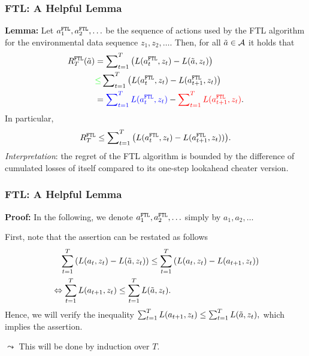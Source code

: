 \documentclass[11pt,compress,t,notes=noshow, xcolor=table]{beamer}
\begin{document}
\begin{frame} 
	\frametitle{FTL: A Helpful Lemma}
	\small
	 \textbf{Lemma:}
		Let $a_1^{\texttt{FTL}}, a_2^{\texttt{FTL}}, \ldots$ be the sequence of actions used by the FTL algorithm for the environmental data sequence $z_1,z_2,\ldots .$
		 Then, for all $\tilde a \in \mathcal{A}$ it holds that 
		\begin{align*}
			R_T^{\FTL}(\tilde a) 
			&= \sum\nolimits_{t=1}^T \left(\l(a_t^{\FTL},z_t) - \l(\tilde a,z_t)\right) \\
%			
			& {\color{green} \leq} \sum\nolimits_{t=1}^T \left(\l(a_t^{\FTL},z_t) - \l(a_{t+1}^{\FTL},z_t)\right)\\
%			
			&= {\color{blue} \sum\nolimits_{t=1}^T \l(a_t^{\FTL},z_t) }-  {\color{red}\sum\nolimits_{t=1}^T  \l(a_{t+1}^{\FTL},z_t)}.
		\end{align*}
		 In particular,
		\begin{equation*}
			R_T^{\texttt{FTL}} \leq \sum\nolimits_{t=1}^T \big(L(a_t^{\texttt{FTL}},z_t) - L(a_{t+1}^{\texttt{FTL}},z_t))\big).
		\end{equation*}
		 \emph{Interpretation}: the regret of the FTL algorithm is {\color{green}bounded} by {\color{blue} the difference of cumulated losses of itself} compared to {\color{red} its one-step lookahead cheater version}.
\end{frame}

\begin{frame} 
	\frametitle{FTL: A Helpful Lemma}
	\small
		\textbf{Proof:}
		In the following, we denote  $a_1^{\texttt{FTL}}, a_2^{\texttt{FTL}}, \ldots$  simply by  $a_1, a_2, \ldots$  	
		
		 First, note that the assertion can be restated as follows
		\begin{equation*}
			\begin{split}
				&\quad \sum\limits_{t=1}^T \left(L(a_t,z_t) - L(\tilde a,z_t)\right) \leq \sum\limits_{t=1}^T \left(L(a_t,z_t) - L(a_{t+1},z_t)\right) \\
				 &\Leftrightarrow \sum\limits_{t=1}^T L(a_{t+1},z_t) \leq  \sum\limits_{t=1}^T L(\tilde a,z_t).
			\end{split} 
		\end{equation*}
		 Hence, we will verify the inequality $\sum\nolimits_{t=1}^T L(a_{t+1},z_t) \leq  \sum\nolimits_{t=1}^T L(\tilde a,z_t),$ which implies the assertion.
		 \lz
		 
		 $\leadsto$ This will be done  by induction over $T$.
\end{frame}
\end{document}
